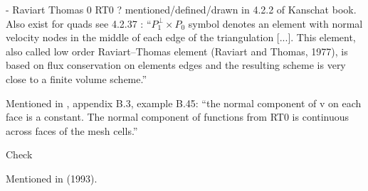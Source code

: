 
- Raviart Thomas 0 RT0 \cite{rath77} ? mentioned/defined/drawn in 4.2.2 of 
Kanschat book. Also exist for quads see 4.2.37 
\textcite{hald03}: ``$P_1^\perp \times P_0$ symbol denotes an element with 
normal velocity nodes in the middle of each edge of the
triangulation [...]. This element, also called low order Raviart–Thomas element 
(Raviart and Thomas, 1977), is based on flux conservation on elements edges and 
the resulting scheme is very close to a finite volume scheme.''

Mentioned in \textcite{john16}, appendix B.3, example B.45: ``the normal component of v 
on each face is a constant. The normal component of functions from RT0 is
continuous across faces of the mesh cells.''

Check \textcite{brfo}

Mentioned in \textcite{chen93a} (1993).
